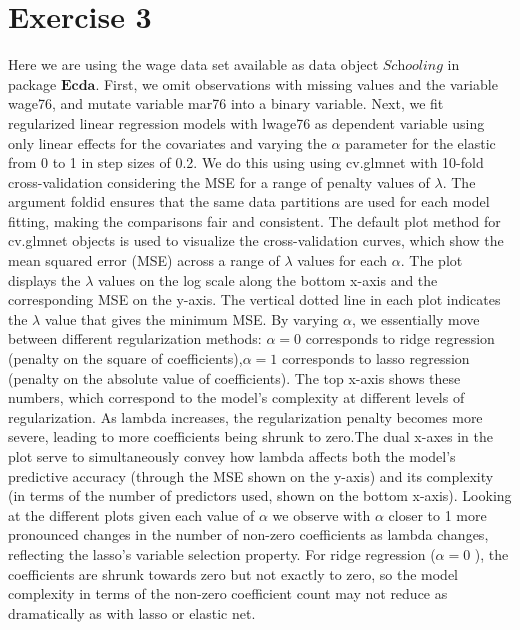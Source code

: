 \documentclass[
]{article}
\begin{document}
\hypertarget{exercise-3}{%
\section{Exercise 3}\label{exercise-3}}

Here we are using the wage data set available as data object
\(\textit{Schooling}\) in package \(\textbf{Ecda}\). First, we omit
observations with missing values and the variable wage76, and mutate
variable mar76 into a binary variable. Next, we fit regularized linear
regression models with lwage76 as dependent variable using only linear
effects for the covariates and varying the \(\alpha\) parameter for the
elastic from 0 to 1 in step sizes of 0.2. We do this using using
cv.glmnet with 10-fold cross-validation considering the MSE for a range
of penalty values of \(\lambda\). The argument foldid ensures that the
same data partitions are used for each model fitting, making the
comparisons fair and consistent. The default plot method for cv.glmnet
objects is used to visualize the cross-validation curves, which show the
mean squared error (MSE) across a range of \(\lambda\) values for each
\(\alpha\). The plot displays the \(\lambda\) values on the log scale
along the bottom x-axis and the corresponding MSE on the y-axis. The
vertical dotted line in each plot indicates the \(\lambda\) value that
gives the minimum MSE. By varying \(\alpha\), we essentially move
between different regularization methods: \(\alpha = 0\) corresponds to
ridge regression (penalty on the square of coefficients),\(\alpha = 1\)
corresponds to lasso regression (penalty on the absolute value of
coefficients). The top x-axis shows these numbers, which correspond to
the model's complexity at different levels of regularization. As lambda
increases, the regularization penalty becomes more severe, leading to
more coefficients being shrunk to zero.The dual x-axes in the plot serve
to simultaneously convey how lambda affects both the model's predictive
accuracy (through the MSE shown on the y-axis) and its complexity (in
terms of the number of predictors used, shown on the bottom x-axis).
Looking at the different plots given each value of \(\alpha\) we observe
with \(\alpha\) closer to 1 more pronounced changes in the number of
non-zero coefficients as lambda changes, reflecting the lasso's variable
selection property. For ridge regression (\(\alpha = 0\) ), the
coefficients are shrunk towards zero but not exactly to zero, so the
model complexity in terms of the non-zero coefficient count may not
reduce as dramatically as with lasso or elastic net.
\end{document}
